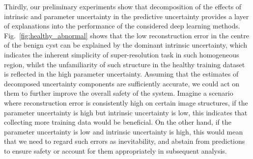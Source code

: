  Thirdly, our preliminary experiments show that decomposition of the effects of intrinsic and parameter uncertainty in the predictive uncertainty provides a layer of explanations into the performance of the considered deep learning methods. Fig.~\ref{fig:healthy_abnormal} shows that the low reconstruction error in the centre of the benign cyst can be explained by the dominant intrinsic uncertainty, which indicates the inherent simplicity of super-resolution task in such homogeneous region, whilst the unfamiliarity of such structure in the healthy training dataset is reflected in the high parameter uncertainty. Assuming that the estimates of decomposed uncertainty components are sufficiently accurate, we could act on them to further improve the overall safety of the system. Imagine a scenario where reconstruction error is consistently high on certain image structures, if the parameter uncertainty is high but intrinsic uncertainty is low, this indicates that collecting more training data would be beneficial. On the other hand, if the parameter uncertainty is low and intrinsic uncertainty is high, this would mean that we need to regard such errors as inevitability, and abstain from predictions to ensure safety or account for them appropriately in subsequent analysis.
 
